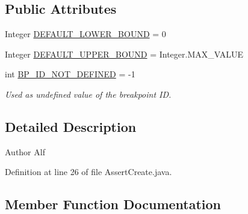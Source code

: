 \subsection*{Public Attributes}
\begin{DoxyCompactItemize}
\item 
Integer \hyperlink{interfacegov_1_1nasa_1_1jpf_1_1inspector_1_1interfaces_1_1_break_point_creation_information_a40131b93f82a84ed5322c4dc5ca4175e}{D\+E\+F\+A\+U\+L\+T\+\_\+\+L\+O\+W\+E\+R\+\_\+\+B\+O\+U\+ND} = 0
\item 
Integer \hyperlink{interfacegov_1_1nasa_1_1jpf_1_1inspector_1_1interfaces_1_1_break_point_creation_information_af917e7de77b2a6fc93c24e1c5a4a5759}{D\+E\+F\+A\+U\+L\+T\+\_\+\+U\+P\+P\+E\+R\+\_\+\+B\+O\+U\+ND} = Integer.\+M\+A\+X\+\_\+\+V\+A\+L\+UE
\item 
int \hyperlink{interfacegov_1_1nasa_1_1jpf_1_1inspector_1_1interfaces_1_1_break_point_creation_information_a24626231e3744e59f505d0731d4ca9e1}{B\+P\+\_\+\+I\+D\+\_\+\+N\+O\+T\+\_\+\+D\+E\+F\+I\+N\+ED} = -\/1
\begin{DoxyCompactList}\small\item\em Used as undefined value of the breakpoint ID. \end{DoxyCompactList}\end{DoxyCompactItemize}


\subsection{Detailed Description}
\begin{DoxyAuthor}{Author}
Alf 
\end{DoxyAuthor}


Definition at line 26 of file Assert\+Create.\+java.



\subsection{Member Function Documentation}
